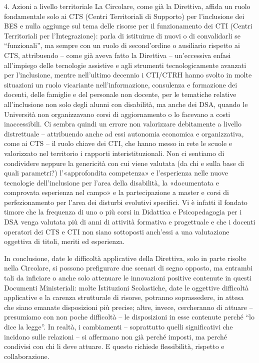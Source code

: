 4. Azioni a livello territoriale
La Circolare, come già la Direttiva, affida un ruolo fondamentale solo ai CTS (Centri Territoriali di Supporto) per l’inclusione dei BES e nulla aggiunge sul tema delle risorse per il funzionamento dei CTI (Centri Territoriali per l’Integrazione): parla di istituirne di nuovi o di convalidarli se “funzionali”, ma sempre con un ruolo di second’ordine o ausiliario rispetto ai CTS, attribuendo – come già aveva fatto la Direttiva – un’eccessiva enfasi all’impiego delle tecnologie assistive e agli strumenti tecnologicamente avanzati per l’inclusione, mentre nell’ultimo decennio i CTI/CTRH hanno svolto in molte situazioni un ruolo vicariante nell’informazione, consulenza e formazione dei  docenti, delle famiglie e del personale non docente, per le tematiche relative all’inclusione non solo degli alunni con disabilità, ma anche dei DSA, quando le Università non organizzavano corsi di aggiornamento o lo facevano a costi inaccessibili.
Ci sembra quindi un errore non valorizzare debitamente a livello distrettuale – attribuendo anche ad essi autonomia economica e organizzativa, come ai CTS – il ruolo chiave dei CTI, che hanno messo in rete le scuole e valorizzato nel territorio i rapporti interistituzionali.
Non ci sentiamo di condividere neppure la genericità con cui viene valutata (da chi e sulla base di quali parametri?) l’«approfondita competenza» e l’esperienza nelle nuove tecnologie dell’inclusione per l’area della disabilità, la «documentata e comprovata esperienza nel campo» e la partecipazione a master e corsi di perfezionamento per l’area dei disturbi evolutivi specifici. Vi è infatti il fondato timore che la frequenza di uno o più corsi in Didattica e Psicopedagogia per i DSA venga valutata più di anni di attività formativa e progettuale e che i docenti operatori dei CTS e CTI non siano sottoposti anch’essi a una valutazione oggettiva di titoli, meriti ed esperienza.

In conclusione, date le difficoltà applicative della Direttiva, solo in parte risolte nella Circolare, si possono prefigurare due scenari di segno opposto, ma entrambi tali da inficiare o anche solo attenuare le innovazioni positive contenute in questi Documenti Ministeriali: molte Istituzioni Scolastiche, date le oggettive difficoltà applicative e la carenza strutturale di risorse, potranno soprassedere, in attesa che siano emanate disposizioni più precise; altre, invece, cercheranno di attuare – presumiamo con non poche difficoltà – le disposizioni in esse contenute perché “lo dice la legge”.
In realtà, i cambiamenti – soprattutto quelli significativi che incidono sulle relazioni – si affermano non già perché imposti, ma perché condivisi con chi li deve attuare. E questo richiede flessibilità, rispetto e collaborazione.

